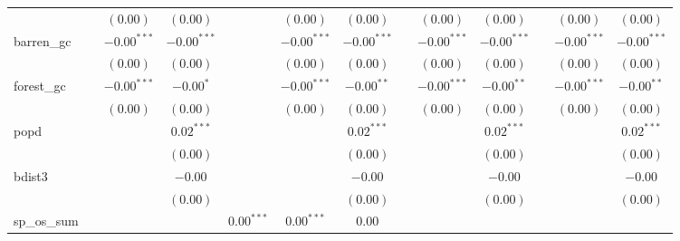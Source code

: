 \begin{sidewaystable}
\begin{center}
{\begin{tabular}{l c c c c c c c c c c c c}
                    &               & $(0.00)$      & $(0.00)$        &               & $(0.00)$        & $(0.00)$       &               & $(0.00)$        & $(0.00)$       &               & $(0.00)$        & $(0.00)$       \\
barren\_gc          &               & $-0.00^{***}$ & $-0.00^{***}$   &               & $-0.00^{***}$   & $-0.00^{***}$  &               & $-0.00^{***}$   & $-0.00^{***}$  &               & $-0.00^{***}$   & $-0.00^{***}$  \\
                    &               & $(0.00)$      & $(0.00)$        &               & $(0.00)$        & $(0.00)$       &               & $(0.00)$        & $(0.00)$       &               & $(0.00)$        & $(0.00)$       \\
forest\_gc          &               & $-0.00^{***}$ & $-0.00^{*}$     &               & $-0.00^{***}$   & $-0.00^{**}$   &               & $-0.00^{***}$   & $-0.00^{**}$   &               & $-0.00^{***}$   & $-0.00^{**}$   \\
                    &               & $(0.00)$      & $(0.00)$        &               & $(0.00)$        & $(0.00)$       &               & $(0.00)$        & $(0.00)$       &               & $(0.00)$        & $(0.00)$       \\
popd                &               &               & $0.02^{***}$    &               &                 & $0.02^{***}$   &               &                 & $0.02^{***}$   &               &                 & $0.02^{***}$   \\
                    &               &               & $(0.00)$        &               &                 & $(0.00)$       &               &                 & $(0.00)$       &               &                 & $(0.00)$       \\
bdist3              &               &               & $-0.00$         &               &                 & $-0.00$        &               &                 & $-0.00$        &               &                 & $-0.00$        \\
                    &               &               & $(0.00)$        &               &                 & $(0.00)$       &               &                 & $(0.00)$       &               &                 & $(0.00)$       \\
sp\_os\_sum         &               &               &                 & $0.00^{***}$  & $0.00^{***}$    & $0.00$         &               &                 &                &               &                 &                \\

\end{tabular}}
\end{center}
\end{sidewaystable}
